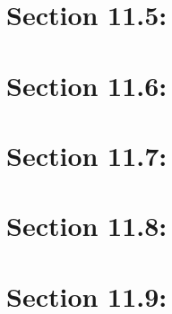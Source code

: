 \documentclass[oneside]{book}
\begin{document}
\section{Section 11.5: }



\section{Section 11.6: }



\section{Section 11.7: }



\section{Section 11.8: }



\section{Section 11.9: }


\end{document}
